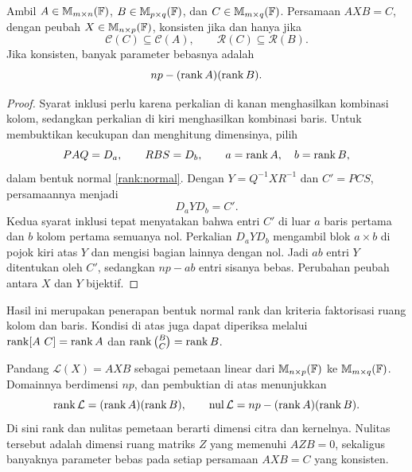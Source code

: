 \begin{teorema}
    Ambil $A\in\mathbb{M}_{m\times n}(\mathbb{F})$,
    $B\in\mathbb{M}_{p\times q}(\mathbb{F})$, dan $C\in\mathbb{M}_{m\times q}(\mathbb{F})$.
    Persamaan $AXB=C$, dengan peubah $X\in\mathbb{M}_{n\times p}(\mathbb{F})$,
    konsisten jika dan hanya jika
    \[
        \mathcal C(C)\subseteq\mathcal C(A),\qquad
        \mathcal R(C)\subseteq\mathcal R(B).
    \]
    Jika konsisten, banyak parameter bebasnya adalah
    \[
        np-(\operatorname{rank} A)(\operatorname{rank} B).
    \]
\end{teorema}
\begin{proof}
    Syarat inklusi perlu karena perkalian di kanan menghasilkan
    kombinasi kolom, sedangkan perkalian di kiri menghasilkan kombinasi baris.
    Untuk membuktikan kecukupan dan menghitung dimensinya, pilih
    \[
        PAQ=D_a,\qquad RBS=D_b,\qquad a=\operatorname{rank} A,\quad b=\operatorname{rank} B,
    \]
    dalam bentuk normal \autoref{rank:normal}.
    Dengan $Y=Q^{-1}XR^{-1}$ dan $C'=PCS$, persamaannya menjadi
    \[
        D_aYD_b=C'.
    \]
    Kedua syarat inklusi tepat menyatakan bahwa entri $C'$ di luar
    $a$ baris pertama dan $b$ kolom pertama semuanya nol.
    Perkalian $D_aYD_b$ mengambil blok $a\times b$ di pojok kiri atas
    $Y$ dan mengisi bagian lainnya dengan nol.
    Jadi $ab$ entri $Y$ ditentukan oleh $C'$, sedangkan $np-ab$ entri
    sisanya bebas. Perubahan peubah antara $X$ dan $Y$ bijektif.
\end{proof}

Hasil ini merupakan penerapan bentuk normal rank dan kriteria
faktorisasi ruang kolom dan baris.
Kondisi di atas juga dapat diperiksa melalui
$\operatorname{rank}[A\ C]=\operatorname{rank} A$ dan
$\operatorname{rank}\binom{B}{C}=\operatorname{rank} B$.

Pandang $\mathcal L(X)=AXB$ sebagai pemetaan linear dari
$\mathbb{M}_{n\times p}(\mathbb{F})$ ke $\mathbb{M}_{m\times q}(\mathbb{F})$.
Domainnya berdimensi $np$, dan pembuktian di atas menunjukkan
\[
    \operatorname{rank}\mathcal L=(\operatorname{rank} A)(\operatorname{rank} B),\qquad
    \operatorname{nul}\mathcal L=np-(\operatorname{rank} A)(\operatorname{rank} B).
\]
Di sini rank dan nulitas pemetaan berarti dimensi citra dan kernelnya.
Nulitas tersebut adalah dimensi ruang matriks $Z$ yang memenuhi $AZB=0$,
sekaligus banyaknya parameter bebas pada setiap persamaan $AXB=C$
yang konsisten.


